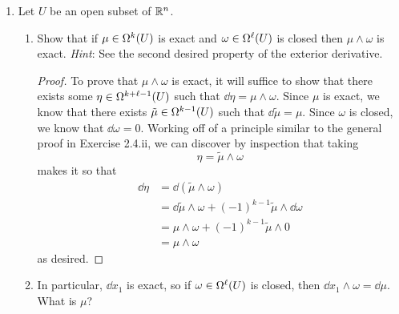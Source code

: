 \documentclass[../psets.tex]{subfiles}
\begin{document}
\begin{enumerate}[label={\textbf{2.4.\roman*.}}]
\begin{enumerate}
\begin{proof}
\begin{align*}
                \Aboxed{\mu &= \left( \frac{1}{3}x_1^3+x_1x_2^2 \right)\dd{x_2}}
            \end{align*}
        \end{proof}
        \item $\cos(x_1)\dd{x_1}\wedge\dd{x_3}$.
        \begin{proof}
            Using the above formula, we have
            \begin{align*}
                \mu &= \left( \int\cos(x_1)\dd{x_1} \right)\dd{x_3}\\
                \Aboxed{\mu &= \sin(x_1)\dd{x_3}}
            \end{align*}
        \end{proof}
    \end{enumerate}
    \item Let $U$ be an open subset of $\R^n$.
    \begin{enumerate}
        \item Show that if $\mu\in\ome[k]{U}$ is exact and $\omega\in\ome[\ell]{U}$ is closed then $\mu\wedge\omega$ is exact. \emph{Hint}: See the second desired property of the exterior derivative.
        \begin{proof}
            To prove that $\mu\wedge\omega$ is exact, it will suffice to show that there exists some $\eta\in\ome[k+\ell-1]{U}$ such that $\dd\eta=\mu\wedge\omega$. Since $\mu$ is exact, we know that there exists $\tilde{\mu}\in\ome[k-1]{U}$ such that $\dd\tilde{\mu}=\mu$. Since $\omega$ is closed, we know that $\dd\omega=0$. Working off of a principle similar to the general proof in Exercise 2.4.ii, we can discover by inspection that taking
            \begin{equation*}
                \eta = \tilde{\mu}\wedge\omega
            \end{equation*}
            makes it so that
            \begin{align*}
                \dd\eta &= \dd(\tilde{\mu}\wedge\omega)\\
                &= \dd\tilde{\mu}\wedge\omega+(-1)^{k-1}\tilde{\mu}\wedge\dd\omega\\
                &= \mu\wedge\omega+(-1)^{k-1}\tilde{\mu}\wedge 0\\
                &= \mu\wedge\omega
            \end{align*}
            as desired.
        \end{proof}
        \item In particular, $\dd{x_1}$ is exact, so if $\omega\in\ome[\ell]{U}$ is closed, then $\dd{x_1}\wedge\omega=\dd{\mu}$. What is $\mu$?

\end{enumerate}
\end{enumerate}
\end{document}

